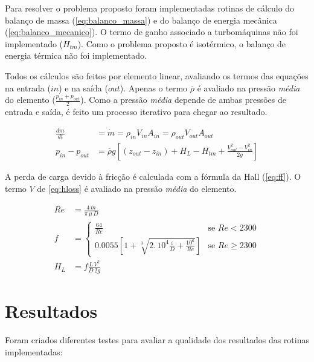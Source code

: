 \documentclass[final,3p]{elsarticle}
\numberwithin{equation}{section}
\begin{document}
        Para resolver o problema proposto foram implementadas rotinas de cálculo do balanço de massa (\ref{eq:balanco_massa}) e do balanço de energia mecânica (\ref{eq:balanco_mecanico}). O termo de ganho associado a turbomáquinas não foi implementado ($H_{tm}$). Como o problema proposto é isotérmico, o balanço de energia térmica não foi implementado.

        Todos os cálculos são feitos por elemento linear, avaliando os termos das equações na entrada ($in$) e na saída ($out$). Apenas o termo $\overline{\rho}$ é avaliado na pressão \emph{média} do elemento ($\frac{p_{in}+p_{out}}{2}$). Como a pressão \emph{média} depende de ambas pressões de entrada e saída, é feito um processo iterativo para chegar ao resultado.

        \begin{align}
          \frac{dm}{dt} &= \dot{m}  = \rho_{in} V_{in} A_{in} = \rho_{out} V_{out} A_{out} \label{eq:balanco_massa} \\
          p_{in} - p_{out} &= \overline{\rho} g \left[ (z_{out} - z_{in}) + H_L - H_{tm} + \frac{V_{out}^2 - V_{in}^2}{2g} \right] \label{eq:balanco_mecanico}
        \end{align}

        A perda de carga devido à fricção é calculada com a fórmula da Hall (\ref{eq:ff}). O termo $V$ de \ref{eq:hloss} é avaliado na pressão \emph{média} do elemento.

        \begin{align}
          Re &= \frac{4 \, \dot{m}}{\pi \, \mu \, D} \label{eq:reynolds} \\
          f &=
          \begin{cases}
            \frac{64}{Re} & \text{se } Re < 2300 \\
            0.0055 \left[ 1+ \sqrt[3]{2.\,10^4 \frac{\varepsilon}{D} + \frac{10^6}{Re}}   \right]     & \text{se } Re \geq 2300
        \end{cases} \label{eq:ff} \\
          H_L &= f \frac{L \, V^2}{D \, 2g} \label{eq:hloss}
        \end{align}


\section{Resultados}

        Foram criados diferentes testes para avaliar a qualidade dos resultados das rotinas implementadas:
\end{document}
